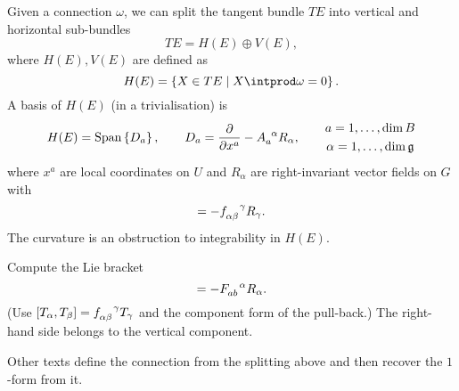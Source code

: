 Given a connection $\omega$, we can split the tangent bundle $T E$ into vertical and horizontal sub-bundles
\begin{equation}
  T E = H(E) \oplus V(E),
\end{equation}
where $H(E), V(E)$ are defined as
\begin{equation}
  H(E) = \left\{X \in TE \suchthat X \intprod \omega = 0\right\}.
\end{equation}
A basis of $H(E)$ (in a trivialisation) is
\begin{equation}
  H(E) = \text{Span}\left\{D_a\right\}, \qquad D_a = \frac{\partial }{\partial x^{a}} - A \indices{_a^{\alpha}} R_{\alpha}, \qquad 
  \begin{gathered}
    a = 1, \dots, \dim B \\
    \alpha = 1, \dots, \dim \mathfrak{g}
  \end{gathered}
\end{equation}
where $x^{a}$ are local coordinates on $U$ and $R_{\alpha}$ are right-invariant vector fields on $G$ with
\begin{equation}
  [R_{\alpha}, R_{\beta}] = -f\indices{_{\alpha\beta}^{\gamma}} R_{\gamma}.
\end{equation}
The curvature is an obstruction to integrability in $H(E)$.
\begin{exercise}
  Compute the Lie bracket
  \begin{equation}
    [D_{a}, D_{b}] = -F\indices{_{ab}^{\alpha}} R_{\alpha}.
  \end{equation}
  (Use $[T_{\alpha}, T_{\beta}] = f\indices{_{\alpha\beta}^{\gamma}} T_{\gamma}$ and the component form of the pull-back.)
  The right-hand side belongs to the vertical component.
\end{exercise}
Other texts define the connection from the splitting above and then recover the $1$-form from it.
